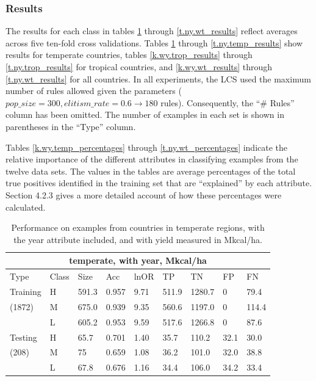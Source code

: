 \documentclass[11pt]{article}
\begin{document}
\subsubsection{Results}
The results for each class in tables \ref{k.wy.temp_results} through \ref{t.ny.wt_results} reflect averages across five ten-fold cross validations. Tables \ref{k.wy.temp_results} through \ref{t.ny.temp_results} show results for temperate countries, tables \ref{k.wy.trop_results} through \ref{t.ny.trop_results} for tropical countries, and \ref{k.wy.wt_results} through \ref{t.ny.wt_results} for all countries. In all experiments, the LCS used the maximum number of rules allowed given the parameters ($pop\_size = 300, elitism\_rate = 0.6 \longrightarrow 180$ rules). Consequently, the ``\# Rules'' column has been omitted. The number of examples in each set is shown in parentheses in the ``Type'' column.

Tables \ref{k.wy.temp_percentages} through \ref{t.ny.wt_percentages} indicate the relative importance of the different attributes in classifying examples from the twelve data sets. The values in the tables are average percentages of the total true positives identified in the training set that are ``explained'' by each attribute. Section 4.2.3 gives a more detailed account of how these percentages were calculated.

\begin{table}[h!]
\centering
\begin{tabular}{lllllllll}
\toprule
\multicolumn{9}{c}{\textbf{temperate, with year, Mkcal/ha}} \\
\midrule
Type & Class & Size & Acc & lnOR & TP & TN & FP & FN \\
\midrule
Training & H & 591.3 & 0.957 & 9.71 & 511.9 & 1280.7 & 0 & 79.4  \\
(1872) & M & 675.0 & 0.939 & 9.35 & 560.6 & 1197.0 & 0 & 114.4  \\
& L & 605.2 & 0.953 & 9.59 & 517.6 & 1266.8 & 0 & 87.6  \\
Testing & H & 65.7 & 0.701 & 1.40 & 35.7 & 110.2 & 32.1 & 30.0  \\
(208) & M & 75 & 0.659 & 1.08 & 36.2 & 101.0 & 32.0 & 38.8  \\
& L & 67.8 & 0.676 & 1.16 & 34.4 & 106.0 & 34.2 & 33.4  \\
\bottomrule
\end{tabular}
\caption{Performance on examples from countries in temperate regions, with the year attribute included, and with yield measured in Mkcal/ha.}
\label{k.wy.temp_results}
\end{table}
\end{document}
